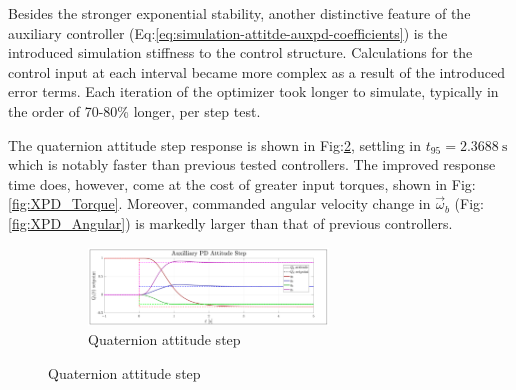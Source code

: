 Besides the stronger exponential stability, another distinctive feature of the auxiliary controller (Eq:\ref{eq:simulation-attitde-auxpd-coefficients}) is the introduced simulation stiffness to the control structure. Calculations for the control input at each interval became more complex as a result of the introduced error terms. Each iteration of the optimizer took longer to simulate, typically in the order of 70-80\% longer, per step test.
\par
The quaternion attitude step response is shown in Fig:\ref{fig:XPD_Step}, settling in $t_{95}=2.3688~\text{s}$ which is notably faster than previous tested controllers. The improved response time does, however, come at the cost of greater input torques, shown in Fig:\ref{fig:XPD_Torque}. Moreover, commanded angular velocity change in $\vec{\omega}_b$ (Fig:\ref{fig:XPD_Angular}) is markedly larger than that of previous controllers.
\begin{figure}[hbtp]
\vspace{-8pt}
\centering
\begin{subfigure}{\textwidth}
\centering
\includegraphics[width=0.7\textwidth]{graphs/XPD_Step}
\vspace{-6pt}
\caption{Quaternion attitude step}
\label{fig:XPD_Step}
\end{subfigure}
\vspace{-14pt}
\end{figure}
\newpage
